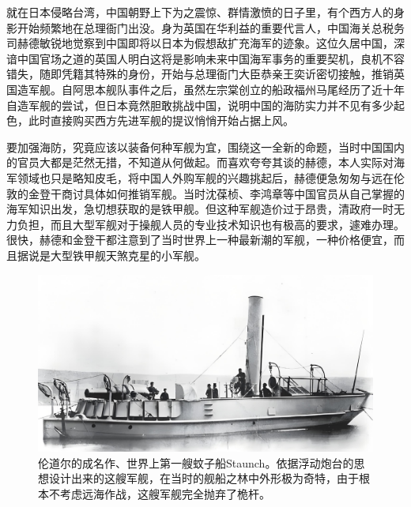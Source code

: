 \documentclass[12pt,UTF8]{ctexbook}
\begin{document}
就在日本侵略台湾，中国朝野上下为之震惊、群情激愤的日子里，有个西方人的身影开始频繁地在总理衙门出没。身为英国在华利益的重要代言人，中国海关总税务司赫德敏锐地觉察到中国即将以日本为假想敌扩充海军的迹象。这位久居中国，深谙中国官场之道的英国人明白这将是影响未来中国海军事务的重要契机，良机不容错失，随即凭籍其特殊的身份，开始与总理衙门大臣恭亲王奕䜣密切接触，推销英国造军舰。自阿思本舰队事件之后，虽然左宗棠创立的船政福州马尾经历了近十年自造军舰的尝试，但日本竟然胆敢挑战中国，说明中国的海防实力并不见有多少起色，此时直接购买西方先进军舰的提议悄悄开始占据上风。

要加强海防，究竟应该以装备何种军舰为宜，围绕这一全新的命题，当时中国国内的官员大都是茫然无措，不知道从何做起。而喜欢夸夸其谈的赫德，本人实际对海军领域也只是略知皮毛，将中国人外购军舰的兴趣挑起后，赫德便急匆匆与远在伦敦的金登干商讨具体如何推销军舰。当时沈葆桢、李鸿章等中国官员从自己掌握的海军知识出发，急切想获取的是铁甲舰。但这种军舰造价过于昂贵，清政府一时无力负担，而且大型军舰对于操舰人员的专业技术知识也有极高的要求，遽难办理。很快，赫德和金登干都注意到了当时世界上一种最新潮的军舰，一种价格便宜，而且据说是大型铁甲舰天煞克星的小军舰。

\begin{figure}[htbp]
	\centering
	\includegraphics[width=1\linewidth]{Images/3}
	\caption{伦道尔的成名作、世界上第一艘蚊子船Staunch。依据浮动炮台的思想设计出来的这艘军舰，在当时的舰船之林中外形极为奇特，由于根本不考虑远海作战，这艘军舰完全抛弃了桅杆。}
	\label{fig:1}
\end{figure}
\end{document}
